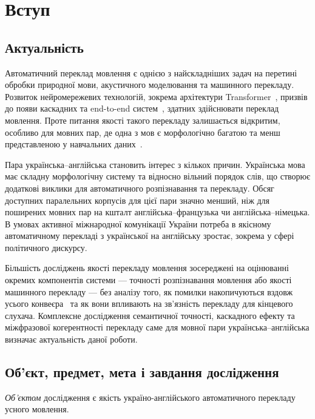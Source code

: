 \setcounter{secnumdepth}{3}
\section{Вступ}

\subsection{Актуальність}

Автоматичний переклад мовлення є однією з найскладніших задач на перетині
обробки природної мови, акустичного моделювання та машинного перекладу.
Розвиток нейромережевих технологій, зокрема архітектури
Transformer~\cite{vaswani}, призвів до появи каскадних та end-to-end
систем~\cite{cascade_st, st_survey}, здатних здійснювати переклад
мовлення. Проте питання якості такого перекладу залишається відкритим,
особливо для мовних пар, де одна з мов є морфологічно багатою та менш
представленою у навчальних даних~\cite{low_resource_mt}.

Пара українська--англійська становить інтерес з кількох причин. Українська мова
має складну морфологічну систему та відносно вільний порядок слів, що створює
додаткові виклики для автоматичного розпізнавання та перекладу. Обсяг доступних
паралельних корпусів для цієї пари значно менший, ніж для поширених мовних
пар на кшталт англійська--французька чи англійська--німецька. В умовах активної
міжнародної комунікації України потреба в якісному автоматичному перекладі
з української на англійську зростає, зокрема у сфері політичного дискурсу.

Більшість досліджень якості перекладу мовлення зосереджені на оцінюванні
окремих компонентів системи --- точності розпізнавання мовлення або якості
машинного перекладу --- без аналізу того, як помилки накопичуються вздовж
усього конвеєра~\cite{error_propagation, bentivogli_cascade} та як вони
впливають на зв'язність перекладу для кінцевого слухача. Комплексне
дослідження семантичної точності, каскадного ефекту та міжфразової
когерентності перекладу саме для мовної пари українська--англійська
визначає актуальність даної роботи.

\subsection{Об'єкт, предмет, мета і завдання дослідження}

\textit{Об'єктом} дослідження є якість україно-англійського автоматичного
перекладу усного мовлення.

